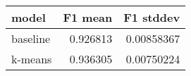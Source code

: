 \begin{tabular}{lrr}
\toprule
 model    &   F1 mean &   F1 stddev \\
\midrule
 baseline &  0.926813 &  0.00858367 \\
 k-means  &  0.936305 &  0.00750224 \\
\bottomrule
\end{tabular}